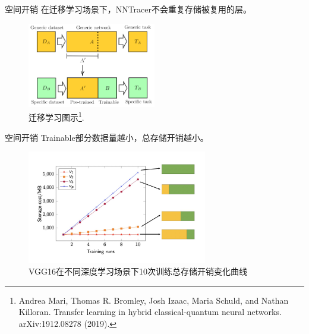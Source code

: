 \documentclass{beamer}
\begin{document}
\begin{frame}{空间开销}
在迁移学习场景下，NNTracer不会重复存储被复用的层。
\begin{figure}
    \centering
    \includegraphics[width=0.5\textwidth]{transfer_learning_general.png}
    \caption{迁移学习图示\footnote{Andrea Mari, Thomas R. Bromley, Josh Izaac, Maria Schuld, and Nathan Killoran. Transfer learning in hybrid classical-quantum neural networks. arXiv:1912.08278 (2019).}.}
    \label{fig:2}
\end{figure}
\end{frame}

\begin{frame}{空间开销}
Trainable部分数据量越小，总存储开销越小。
\begin{figure}
    \centering
    \includegraphics[width=0.7\textwidth]{storage.jpg}
    \caption{VGG16在不同深度学习场景下10次训练总存储开销变化曲线}
    \label{fig:my_label}
\end{figure}
\end{frame}

\end{document}
